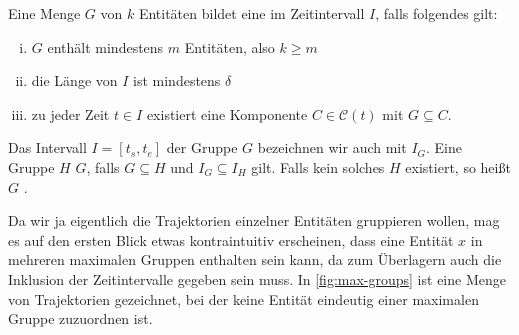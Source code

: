 \begin{definition}[{name=[Gruppe während eines Zeitraums]}]
	Eine Menge $G$ von $k$ Entitäten bildet eine  im Zeitintervall $I$, falls folgendes gilt:
	\begin{enumerate}[(i)]
		\item $G$ enthält mindestens $m$ Entitäten, also $k \ge m$
		\item die Länge von $I$ ist mindestens $\delta$
		\item zu jeder Zeit $t \in I$ existiert eine Komponente $C \in \mathcal{C}(t)$ mit $G \subseteq C$.
	\end{enumerate}
	Das Intervall $I=[t_s,t_e]$ der Gruppe $G$ bezeichnen wir auch mit $I_G$.
	Eine Gruppe $H$  $G$, falls $G \subseteq H$ und $I_G \subseteq I_H$ gilt.
	Falls kein solches $H$ existiert, so heißt $G$ . 
\end{definition}

Da wir ja eigentlich die Trajektorien einzelner Entitäten gruppieren wollen, mag es auf den ersten Blick etwas kontraintuitiv erscheinen, dass eine Entität $x$ in mehreren maximalen Gruppen enthalten sein kann, da zum Überlagern auch die Inklusion der Zeitintervalle gegeben sein muss.
In \cref{fig:max-groups} ist eine Menge von Trajektorien gezeichnet, bei der keine Entität eindeutig einer maximalen Gruppe zuzuordnen ist.

